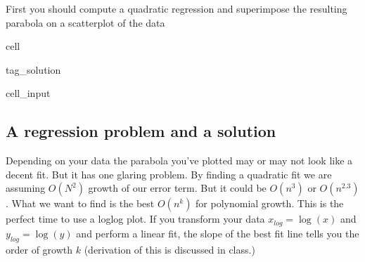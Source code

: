 \documentclass[letterpaper,10pt,english]{jupyterBook}
\begin{document}
\begin{sphinxVerbatim}[commandchars=\\\{\}]
  
  
      
     
   
   
\end{sphinxVerbatim}

\sphinxAtStartPar
First you should compute a quadratic regression and superimpose the resulting parabola on a scatterplot of the data

\begin{sphinxuseclass}{cell}
\begin{sphinxuseclass}{tag_solution}\begin{sphinxVerbatimInput}

\begin{sphinxuseclass}{cell_input}
\begin{sphinxVerbatim}[commandchars=\\\{\}]
\end{sphinxVerbatim}

\end{sphinxuseclass}\end{sphinxVerbatimInput}

\end{sphinxuseclass}
\end{sphinxuseclass}

\subsection{A regression problem and a solution}
\label{\detokenize{lessons/Gaussian_Elimination-student:a-regression-problem-and-a-solution}}
\sphinxAtStartPar
Depending on your data the parabola you’ve plotted may or may not look like a decent fit. But it has one glaring problem. By finding a quadratic fit we are assuming \(O(N^2)\) growth of our error term. But it could be \(O(n^3)\) or \(O(n^{2.3})\). What we want to find is the best  \(O(n^k)\) for polynomial growth. This is the perfect time to use a log\sphinxhyphen{}log plot. If you transform your data \(x_{log} = \log(x)\) and \(y_{log} = \log(y)\) and perform a linear fit, the slope of the best fit line tells you the order of growth \(k\) (derivation of this is discussed in class.)
\end{document}
